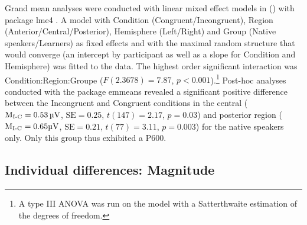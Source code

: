 \documentclass[output=paper,colorlinks,citecolor=brown,modfonts,nonflat]{../langscibook}
\begin{document}
Grand mean analyses were conducted with linear mixed effect models in (\citealt{RCoreTeam2019}) with package lme4 \citep{BatesEtAl2015}. A model with Condition (Congruent\slash Incongruent), Region (Anterior\slash Central\slash Posterior), Hemisphere (Left\slash Right) and Group (Native speakers\slash Learners) as fixed effects and with the maximal random structure that would converge (an intercept by participant as well as a slope for Condition and Hemisphere) was fitted to the data. The highest order significant interaction was Condition:Region:Groupe ($F(2.3678) = 7.87$, $p < 0.001$).\footnote{A type III ANOVA was run on the model with a Satterthwaite estimation of the degrees of freedom.} Post-hoc analyses conducted with the package emmeans \citep{Lenth2019} revealed a significant positive difference between the Incongruent and Congruent conditions in the central ($\text{M\textsubscript{I-C}} = 0.53 \text{\,µV}$, $\text{SE} = 0.25$, $t(147) = 2.17$, $p = 0.03$) and posterior region ($\text{M\textsubscript{I-C}} = 0.65 \text{µV}$, $\text{SE} = 0.21$, $t(77) = 3.11$, $p = 0.003$) for the native speakers only. Only this group thus exhibited a P600.

\subsection{Individual differences: Magnitude}
\end{document}
